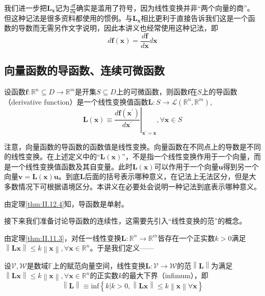 \documentclass[main.tex]{subfiles}
\begin{document}
我们进一步把$\mathbf{L}_{\mathbf{x}}$记为$\frac{d\mathbf{f}}{d\mathbf{x}}$确实是滥用了符号，因为线性变换并非“两个向量的商”。但这种记法是很多资料都使用的惯例。与$\mathbf{L}_\mathbf{x}$相比更利于直接告诉我们这是一个函数的导数而无需另作文字说明，因此本讲义也经常使用这种记法，即
\[
d\mathbf{f}\left(\mathbf{x}\right)=\frac{d\mathbf{f}}{d\mathbf{x}}d\mathbf{x}\]

\subsection{向量函数的导函数、连续可微函数}
\begin{definition}[向量函数的导函数]
设函数$\mathbf{f}:\mathbb{R}^n\subseteq D\rightarrow\mathbb{R}^m$是开集$S\subseteq D$上的可微函数，则函数$\mathbf{f}$在$S$上的导函数（derivative function）是一个线性变换值函数$\mathbf{L}:S\rightarrow\mathcal{L}\left(\mathbb{R}^n,\mathbb{R}^m\right)$,
\[
\mathbf{L}\left(\mathbf{x}\right)\equiv\left.\frac{d\mathbf{f}\left(\mathbf{x}^\prime\right)}{d\mathbf{x}^\prime}\right|_{\mathbf{x}^\prime=\mathbf{x}},\forall\mathbf{x}\in S
\]
\end{definition}

注意，向量函数的导函数的函数值是线性变换。向量函数在不同点上的导数是不同的线性变换。在上述定义中的“$\mathbf{L}\left(\mathbf{x}\right)$”，不是指一个线性变换作用于一个向量，而是一个线性变换值函数及其自变量。此时$\mathbf{L}\left(\mathbf{x}\right)$可以作用于一个向量$\mathbf{u}$得到另一个向量$\mathbf{v}=\mathbf{L}\left(\mathbf{x}\right)\mathbf{u}$。到底$\mathbf{L}$后面的括号表示哪种意义，在记法上无法区分，但是大多数情况下可根据语境区分。本讲义在必要处会说明一种记法到底表示哪种意义。

由定理\ref{thm:II.12.4}知，导函数是单射。

接下来我们准备讨论导函数的连续性，这需要先引入“线性变换的范”的概念。

由定理\ref{thm:II.11.3}，对任一线性变换$\mathbf{L}:\mathbb{R}^n\rightarrow\mathbb{R}^m$皆存在一个正实数$k>0$满足$\left\|\mathbf{Lx}\right\|\leq k\left\|\mathbf{x}\right\|,\forall\mathbf{x}\in\mathbb{R}^n$。于是我们定义——
\begin{definition}[线性变换的范]
设$\mathcal{V},\mathcal{W}$是数域$\mathbb{F}$上的赋范向量空间，线性变换$\mathbf{L}:\mathcal{V}\rightarrow\mathcal{W}$的范$\left\|\mathbf{L}\right\|$为满足$\left\|\mathbf{Lx}\right\|\leq k\left\|\mathbf{x}\right\|,\forall\mathbf{x}\in\mathbb{R}^n$的正实数$k$的最大下界（infimum），即
\[\left\|\mathbf{L}\right\|\equiv\mathrm{inf}\left\{k|k>0,\left\|\mathbf{Lx}\right\|\leq k\left\|\mathbf{x}\right\|\forall\mathbf{x}\right\}\]
\end{definition}
\end{document}
